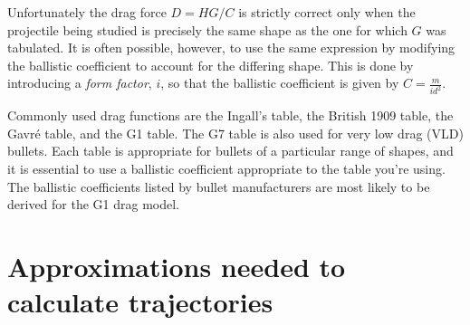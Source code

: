 Unfortunately the drag force $D=HG/C$ is strictly correct only when
the projectile being studied is precisely the same shape as the one
for which $G$ was tabulated.  It is often possible, however, to use
the same expression by modifying the ballistic coefficient to account
for the differing shape.  This is done by introducing a {\em form
factor}, $i$, so that the ballistic coefficient is given by
$C=\frac{m}{id^2}$.

Commonly used drag functions are the Ingall's table, the British
1909 table, the Gavr\'e table, and the G1 table.  The G7 table is also
used for very low drag (VLD) bullets.  Each table is appropriate for
bullets of a particular range of shapes, and it is essential to use a
ballistic coefficient appropriate to the table you're using.  The
ballistic coefficients listed by bullet manufacturers are most likely
to be derived for the G1 drag model.

\section{Approximations needed to calculate trajectories}


